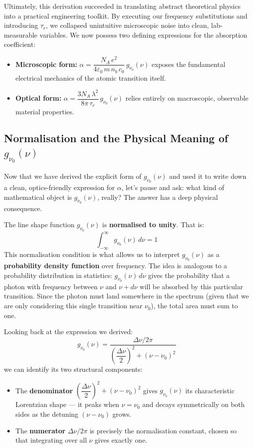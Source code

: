Ultimately, this derivation succeeded in translating abstract theoretical physics into a practical engineering toolkit. By executing our frequency substitutions and introducing $\tau_r$, we collapsed unintuitive microscopic noise into clean, lab-measurable variables. We now possess two defining expressions for the absorption coefficient:
\begin{itemize}
    \item \textbf{Microscopic form:} $\alpha = \dfrac{N_A\,e^2}{4\varepsilon_0\,m\,n_b\,c_0}\,g_{\nu_0}(\nu)$ exposes the fundamental electrical mechanics of the atomic transition itself.
    \item \textbf{Optical form:} $\alpha = \dfrac{3N_A\,\lambda^2}{8\pi\,\tau_r}\,g_{\nu_0}(\nu)$ relies entirely on macroscopic, observable material properties.
\end{itemize}

\subsection{Normalisation and the Physical Meaning of \texorpdfstring{$g_{\nu_0}(\nu)$}{g(ν)}}

Now that we have derived the explicit form of $g_{\nu_0}(\nu)$ and used it to write down a clean, optics-friendly expression for $\alpha$, let's pause and ask: what kind of mathematical object is $g_{\nu_0}(\nu)$, really? The answer has a deep physical consequence.

The line shape function $g_{\nu_0}(\nu)$ is \textbf{normalised to unity}. That is:
\begin{equation*}
    \int_{-\infty}^{\infty} g_{\nu_0}(\nu)\,d\nu = 1
\end{equation*}
This normalisation condition is what allows us to interpret $g_{\nu_0}(\nu)$ as a \textbf{probability density function} over frequency. The idea is analogous to a probability distribution in statistics: $g_{\nu_0}(\nu)\,d\nu$ gives the probability that a photon with frequency between $\nu$ and $\nu + d\nu$ will be absorbed by this particular transition. Since the photon must land somewhere in the spectrum (given that we are only considering this single transition near $\nu_0$), the total area must sum to one.

Looking back at the expression we derived:
\begin{equation*}
    g_{\nu_0}(\nu) = \frac{\Delta\nu/2\pi}{\left(\dfrac{\Delta\nu}{2}\right)^2 + (\nu - \nu_0)^2}
\end{equation*}
we can identify its two structural components:
\begin{itemize}
    \item The \textbf{denominator} $\left(\dfrac{\Delta\nu}{2}\right)^2 + (\nu - \nu_0)^2$ gives $g_{\nu_0}(\nu)$ its characteristic Lorentzian shape — it peaks when $\nu = \nu_0$ and decays symmetrically on both sides as the detuning $(\nu-\nu_0)$ grows.
    \item The \textbf{numerator} $\Delta\nu/2\pi$ is precisely the normalisation constant, chosen so that integrating over all $\nu$ gives exactly one.
\end{itemize}

